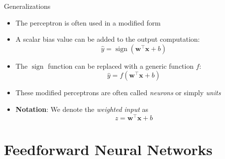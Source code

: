 \documentclass{beamer}
\DeclareMathOperator{\sign}{sign}
\begin{document}
	\begin{frame}{Generalizations}
		\begin{itemize}
			\item <1-> The perceptron is often used in a modified form
			\item <2-> A scalar bias value can be added to the output computation:
			\begin{equation}
			\hat{y} = \sign\left (\bm{w}^\top\bm{x} + b\right )
			\end{equation}
			\item <3-> The $\sign$ function can be replaced with a generic function $f$:
			\begin{equation}
			\hat{y} = f\left (\bm{w}^\top\bm{x} + b\right )
			\end{equation}
			\item <4-> These modified perceptrons are often called \emph{neurons} or simply \emph{units}
			\item <5-> \textbf{Notation}: We denote the \emph{weighted input} as
			\begin{equation}
			z = \bm{w}^\top\bm{x} + b
			\end{equation}
		\end{itemize}
	\end{frame}
%						
	
	\section{Feedforward Neural Networks}
	
\end{document}
